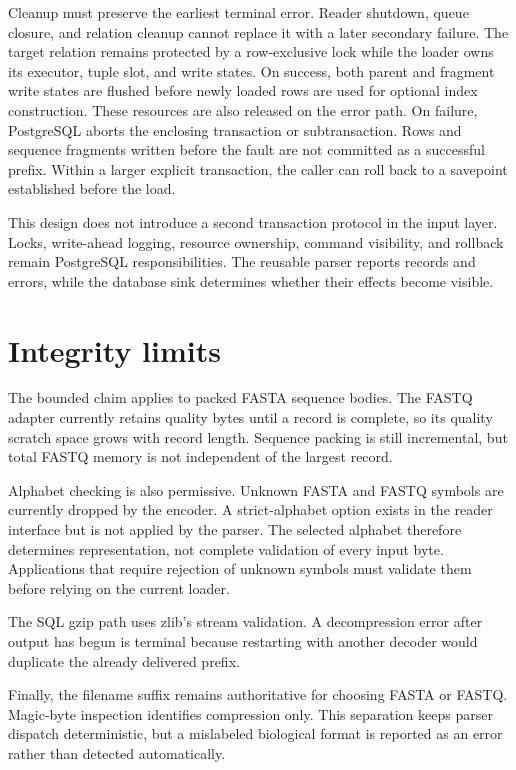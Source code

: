 Cleanup must preserve the earliest terminal error. Reader shutdown, queue
closure, and relation cleanup cannot replace it with a later secondary
failure. The target relation remains protected by a row-exclusive lock while
the loader owns its executor, tuple slot, and write states. On success, both
parent and fragment write states are flushed before newly loaded rows are used
for optional index construction. These resources are also released on the
error path. On failure, PostgreSQL aborts the enclosing transaction or
subtransaction. Rows and sequence fragments written before the fault are not
committed as a successful prefix. Within a larger explicit transaction, the
caller can roll back to a savepoint established before the load.

This design does not introduce a second transaction protocol in the input
layer. Locks, write-ahead logging, resource ownership, command visibility, and
rollback remain PostgreSQL responsibilities. The reusable parser reports
records and errors, while the database sink determines whether their effects
become visible.

\section{Integrity limits}
\label{sec:io-integrity-limits}

The bounded claim applies to packed FASTA sequence bodies. The FASTQ adapter
currently retains quality bytes until a record is complete, so its quality
scratch space grows with record length. Sequence packing is still incremental,
but total FASTQ memory is not independent of the largest record.

Alphabet checking is also permissive. Unknown FASTA and FASTQ symbols are
currently dropped by the encoder. A strict-alphabet option exists in the
reader interface but is not applied by the parser. The selected alphabet
therefore determines representation, not complete validation of every input
byte. Applications that require rejection of unknown symbols must validate
them before relying on the current loader.

The SQL gzip path uses zlib's stream validation. A decompression error after
output has begun is terminal because restarting with
another decoder would duplicate the already delivered prefix.

Finally, the filename suffix remains authoritative for choosing FASTA or
FASTQ. Magic-byte inspection identifies compression only. This separation
keeps parser dispatch deterministic, but a mislabeled biological format is
reported as an error rather than detected automatically.

